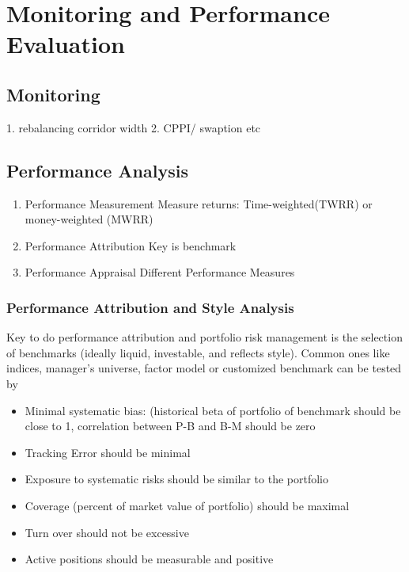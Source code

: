\documentclass[11pt, openany]{book}              %
\begin{document}
\chapter{Monitoring and Performance Evaluation}

\section{Monitoring}
    1. rebalancing corridor width
    2. CPPI/ swaption etc

\section{Performance Analysis}

\begin{enumerate}
 \item Performance Measurement
 \subitem Measure returns: Time-weighted(TWRR) or money-weighted (MWRR)
 \item Performance Attribution
 \subitem Key is benchmark
 \item Performance Appraisal 
 \subitem Different Performance Measures
\end{enumerate}


\subsection{Performance Attribution and Style Analysis} 

Key to do performance attribution and portfolio risk management is the selection of benchmarks (ideally liquid, investable, and reflects style). Common ones like indices, manager's universe, factor model or customized benchmark can be tested by

\begin{itemize}
 \item Minimal systematic bias: (historical beta of portfolio of benchmark should be close to 1, correlation between P-B and B-M should be zero
 \item Tracking Error should be minimal
 \item Exposure to systematic risks should be similar to the portfolio
 \item Coverage (percent of market value of portfolio) should be maximal
 \item Turn over should not be excessive
 \item Active positions should be measurable and positive
 \end{itemize} 
\end{document}
